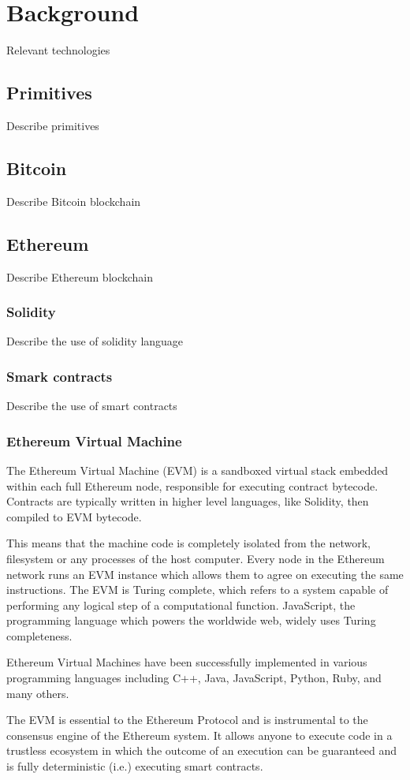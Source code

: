 \documentclass{article}
\begin{document}
\section{Background}
Relevant technologies
\subsection{Primitives}
Describe primitives
\subsection{Bitcoin}
Describe Bitcoin blockchain
\subsection{Ethereum}
Describe Ethereum blockchain
\subsubsection{Solidity}
Describe the use of solidity language
\subsubsection{Smark contracts}
Describe the use of smart contracts
\subsubsection{Ethereum Virtual Machine}
The Ethereum Virtual Machine (EVM) is a sandboxed virtual stack embedded within each full Ethereum node, responsible for executing contract bytecode. Contracts are typically written in higher level languages, like Solidity, then compiled to EVM bytecode.

This means that the machine code is completely isolated from the network, filesystem or any processes of the host computer. Every node in the Ethereum network runs an EVM instance which allows them to agree on executing the same instructions. The EVM is Turing complete, which refers to a system capable of performing any logical step of a computational function. JavaScript, the programming language which powers the worldwide web, widely uses Turing completeness.

Ethereum Virtual Machines have been successfully implemented in various programming languages including C++, Java, JavaScript, Python, Ruby, and many others.

The EVM is essential to the Ethereum Protocol and is instrumental to the consensus engine of the Ethereum system. It allows anyone to execute code in a trustless ecosystem in which the outcome of an execution can be guaranteed and is fully deterministic (i.e.) executing smart contracts.
\end{document}
